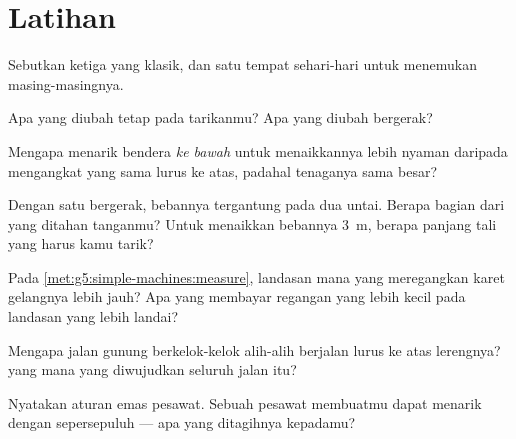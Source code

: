 \section{Latihan}

\begin{exercise}[$\star$]\label{exo:g5:simple-machines:1}
Sebutkan ketiga  yang klasik, dan satu tempat
sehari-hari untuk menemukan masing-masingnya.
\end{exercise}

\begin{exercise}[$\star$]\label{exo:g5:simple-machines:2}
Apa yang diubah  tetap pada tarikanmu? Apa yang diubah 
bergerak?
\end{exercise}

\begin{exercise}[$\star$]\label{exo:g5:simple-machines:3}
Mengapa menarik bendera \emph{ke bawah} untuk menaikkannya lebih
nyaman daripada mengangkat  yang sama lurus ke atas, padahal
tenaganya sama besar?
\end{exercise}

\begin{exercise}[$\star$]\label{exo:g5:simple-machines:4}
Dengan satu  bergerak, bebannya tergantung pada dua untai.
Berapa bagian dari  yang ditahan tanganmu? Untuk menaikkan
bebannya \qty{3}{m}, berapa panjang tali yang harus kamu tarik?
\end{exercise}

\begin{exercise}[$\star$]\label{exo:g5:simple-machines:5}
Pada \cref{met:g5:simple-machines:measure}, landasan mana yang
meregangkan karet gelangnya lebih jauh? Apa yang membayar regangan
yang lebih kecil pada landasan yang lebih landai?
\end{exercise}

\begin{exercise}[$\star$]\label{exo:g5:simple-machines:6}
Mengapa jalan gunung berkelok-kelok alih-alih berjalan lurus ke atas
lerengnya?  yang mana yang diwujudkan seluruh jalan
itu?
\end{exercise}

\begin{exercise}[$\star$]\label{exo:g5:simple-machines:7}
Nyatakan aturan emas pesawat. Sebuah pesawat membuatmu dapat menarik
dengan sepersepuluh  --- apa yang ditagihnya kepadamu?
\end{exercise}

